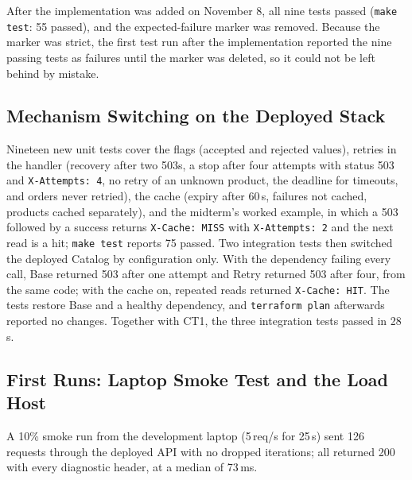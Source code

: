 \documentclass[10pt]{article}
\begin{document}
After the implementation was added on November 8, all nine tests passed
(\texttt{make test}: 55 passed), and the expected-failure marker was removed.
Because the marker was strict, the first test run after the implementation
reported the nine passing tests as failures until the marker was deleted, so it
could not be left behind by mistake.

\subsection{Mechanism Switching on the Deployed Stack}
Nineteen new unit tests cover the flags (accepted and rejected values), retries
in the handler (recovery after two 503s, a stop after four attempts with status
503 and \texttt{X-Attempts: 4}, no retry of an unknown product, the deadline for
timeouts, and orders never retried), the cache (expiry after 60\,s, failures
not cached, products cached separately), and the midterm's worked example, in
which a 503 followed by a success returns \texttt{X-Cache: MISS} with
\texttt{X-Attempts: 2} and the next read is a hit; \texttt{make test} reports
75 passed. Two integration tests then switched the deployed Catalog by
configuration only. With the dependency failing every call, Base returned 503
after one attempt and Retry returned 503 after four, from the same code; with
the cache on, repeated reads returned \texttt{X-Cache: HIT}. The tests restore
Base and a healthy dependency, and \texttt{terraform plan} afterwards reported
no changes. Together with CT1, the three integration tests passed in 28\,s.

\subsection{First Runs: Laptop Smoke Test and the Load Host}
A 10\% smoke run from the development laptop (5\,req/s for 25\,s) sent 126
requests through the deployed API with no dropped iterations; all returned 200
with every diagnostic header, at a median of 73\,ms.
\end{document}
